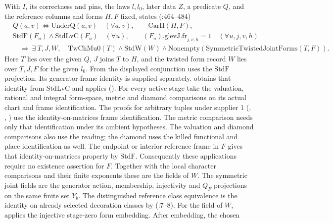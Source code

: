 With $I$, its correctness and pins, the laws $l,l_0$, later data $Z$,
a predicate $Q$, and the reference columns and forms $H,F$ fixed,
 states (:464--484)
\[
\begin{aligned}
 &Q(a,v)\iff\mathrm{UnderQ}(a,v)\quad(\forall a,v),\qquad \mathrm{CarH}(H,F),\\
 &\mathrm{StdF}(F_u)\land\mathrm{StdLvC}(F_u)\quad(\forall u),\qquad
                      (F_u).\mathrm{glevJ.fr}_{j,v,h}=1\quad(\forall u,j,v,h)\\
 &\quad\Longrightarrow\ \exists\ T,J,W,\quad \mathrm{TwChMu0}(T)\land\mathrm{StdW}(W)
              \land\mathrm{Nonempty}(\mathrm{SymmetricTwistedJointForms}(T,F)).
\end{aligned}
\]
Here $T$ lies over the given $Q$, $J$ joins $T$ to $H$, and the twisted form
record $W$ lies over $T,J,F$ for the given $l_0$.
From the displayed conjunction  uses the
$\mathrm{StdF}$ projection. Its generator-frame identity is supplied
separately.  obtains that identity from
$\mathrm{StdLvC}$ and applies 
().
For every active stage take the valuation, rational and integral
form-space, metric and diamond comparisons on its actual chart and frame
identification. The proofs for arbitrary tuples under supplier 1
(, ,
) use the identity-on-matrices frame
identification. The metric comparison needs only that identification
under its ambient hypotheses. The valuation and diamond comparisons
also use the reading; the diamond uses the killed functional and place
identification as well. The endpoint or interior reference
frame in $F$ gives that identity-on-matrices property by $\mathrm{StdF}$.
Consequently these applications require no existence assertion for $F$.
Together with the local character comparisons and their finite exponents
these are the fields of $W$. The symmetric joint fields are the
generator action, membership, injectivity and $Q_F$ projections on the
same finite set $Y_b$. The distinguished reference class equivalence is
the identity on already selected decoration classes by
 (:7--8).
For the field  of $W$,
 applies
the injective stage-zero form embedding. After embedding, the chosen
